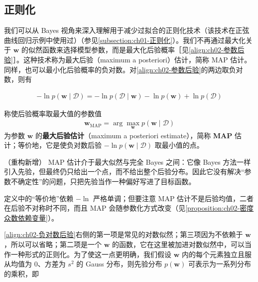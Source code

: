 \documentclass[../../main.tex]{subfiles}
\begin{document}
\subsection{正则化}\label{subsection:ch02-正则化}

我们可以从 Bayes 视角来深入理解用于减少过拟合的正则化技术（该技术在正弦曲线回归示例中使用过）（参见\cref{subsection:ch01-正则化}）。我们不再通过最大化关于 $\mathbf{w}$ 的似然函数来选择模型参数，而是最大化后验概率［见\eqref{align:ch02-参数后验}］。这种技术称为最大后验（maximum a posteriori）估计，简称 MAP 估计。同样，也可以最小化后验概率的负对数。对\eqref{align:ch02-参数后验}的两边取负对数，则有

\begin{align}
  -\ln p(\mathbf{w}\mid\mathcal{D}) = -\ln p(\mathcal{D}\mid\mathbf{w}) - \ln p(\mathbf{w}) + \ln p(\mathcal{D})
  \label{align:ch02-负对数后验}
\end{align}

\begin{definition}[最大后验估计]\label{definition:ch02-map}
称使后验概率取最大值的参数值
\begin{align*}
  \mathbf{w}_{\mathrm{MAP}} = \arg\max_{\mathbf{w}} p(\mathbf{w}\mid\mathcal{D})
\end{align*}
为参数 $\mathbf{w}$ 的\textbf{最大后验估计}（maximum a posteriori estimate），简称 \textbf{MAP} 估计；等价地，它是使负对数后验 $-\ln p(\mathbf{w}\mid\mathcal{D})$ 取最小值的点。
\end{definition}

\begin{remark}（重构新增）
MAP 估计介于最大似然与完全 Bayes 之间：它像 Bayes 方法一样引入先验，但最终仍只给出一个点，而不给出整个后验分布。因此它没有解决“参数不确定性”的问题，只把先验当作一种偏好写进了目标函数。

定义中的“等价地”依赖 $-\ln$ 严格单调；但要注意 MAP 估计不是后验均值，二者在后验不对称时不同，而且 MAP 会随参数化方式改变（见\cref{proposition:ch02-密度众数依赖变量}）。
\end{remark}

\eqref{align:ch02-负对数后验}右侧的第一项是常见的对数似然；第三项因为不依赖于 $\mathbf{w}$，所以可以省略；第二项是一个 $\mathbf{w}$ 的函数，它在这里被加进对数似然中，可以当作一种形式的正则化。为了使这一点更明确，我们假设 $\mathbf{w}$ 内的每个元素独立且服从均值为 $0$、方差为 $s^{2}$ 的 Gauss 分布，则先验分布 $p(\mathbf{w})$ 可表示为一系列分布的乘积，即
\end{document}
